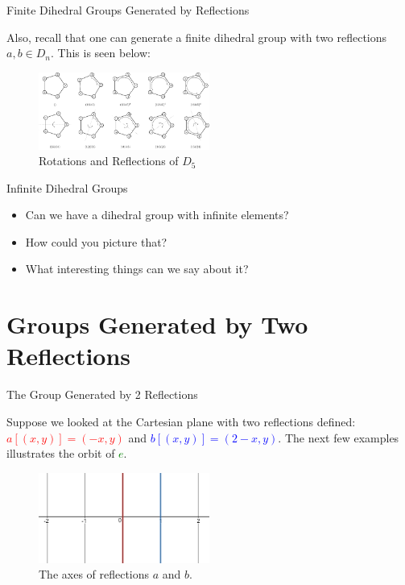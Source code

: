 \documentclass[usenames,dvipsnames]{beamer}
\begin{document}
\begin{frame}{Finite Dihedral Groups Generated by Reflections}

Also, recall that one can generate a finite dihedral group with two reflections $a,b\in D_n$. This is seen
below:

\pause

\begin{figure}[h]
    \centering
    \includegraphics[width=0.50\textwidth]{images/d5_rotations_reflections.png}
    \caption{Rotations and Reflections of $D_5$}
\end{figure}

\end{frame}

\begin{frame}{Infinite Dihedral Groups}

\begin{itemize}
  \item Can we have a dihedral group with infinite elements?
  \pause
  \item How could you picture that?
  \pause
  \item What interesting things can we say about it?
\end{itemize}

\end{frame}


\section{Groups Generated by Two Reflections}

\begin{frame}{The Group Generated by 2 Reflections}

Suppose we looked at the Cartesian plane with two reflections defined: \textcolor{red}{$a[(x,y)]=(-x,y)$}
and \textcolor{blue}{$b[(x,y)]=(2-x,y)$}. The next few examples illustrates the orbit of
\textcolor{green}{$e$}.

\begin{figure}[h]
    \centering
    \includegraphics[width=0.50\textwidth]{images/1-01-d_inf.png}
    \caption{The axes of reflections $a$ and $b$.}
\end{figure}

\end{frame}
\end{document}
